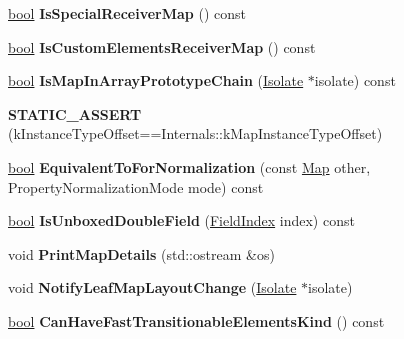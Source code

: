 \begin{DoxyCompactItemize}
\mbox{\hyperlink{classbool}{bool}} {\bfseries Is\+Special\+Receiver\+Map} () const
\item 
\mbox{\label{classv8_1_1internal_1_1Map_a9c4a104a64e7cbe21486505dfc08d41d}} 
\mbox{\hyperlink{classbool}{bool}} {\bfseries Is\+Custom\+Elements\+Receiver\+Map} () const
\item 
\mbox{\label{classv8_1_1internal_1_1Map_a702749d99e7286341ddcbd7d3cce5db2}} 
\mbox{\hyperlink{classbool}{bool}} {\bfseries Is\+Map\+In\+Array\+Prototype\+Chain} (\mbox{\hyperlink{classv8_1_1internal_1_1Isolate}{Isolate}} $\ast$isolate) const
\item 
\mbox{\label{classv8_1_1internal_1_1Map_a0977ec7f818b5f692ccae10afb86dd72}} 
{\bfseries S\+T\+A\+T\+I\+C\+\_\+\+A\+S\+S\+E\+RT} (k\+Instance\+Type\+Offset==Internals\+::k\+Map\+Instance\+Type\+Offset)
\item 
\mbox{\label{classv8_1_1internal_1_1Map_a7a332e2cbf0a995e3b34df56fe4f4d29}} 
\mbox{\hyperlink{classbool}{bool}} {\bfseries Equivalent\+To\+For\+Normalization} (const \mbox{\hyperlink{classv8_1_1internal_1_1Map}{Map}} other, Property\+Normalization\+Mode mode) const
\item 
\mbox{\label{classv8_1_1internal_1_1Map_af20087ddce7acc74f7d524f82e4f232d}} 
\mbox{\hyperlink{classbool}{bool}} {\bfseries Is\+Unboxed\+Double\+Field} (\mbox{\hyperlink{classv8_1_1internal_1_1FieldIndex}{Field\+Index}} index) const
\item 
\mbox{\label{classv8_1_1internal_1_1Map_a72764ee01e7fb78376b3bb58cce37c57}} 
void {\bfseries Print\+Map\+Details} (std\+::ostream \&os)
\item 
\mbox{\label{classv8_1_1internal_1_1Map_aff66966418eb0bcb2911d52eb20a8e48}} 
void {\bfseries Notify\+Leaf\+Map\+Layout\+Change} (\mbox{\hyperlink{classv8_1_1internal_1_1Isolate}{Isolate}} $\ast$isolate)
\item 
\mbox{\label{classv8_1_1internal_1_1Map_a48ea367d026650d423a153ec84396288}} 
\mbox{\hyperlink{classbool}{bool}} {\bfseries Can\+Have\+Fast\+Transitionable\+Elements\+Kind} () const
\end{DoxyCompactItemize}
